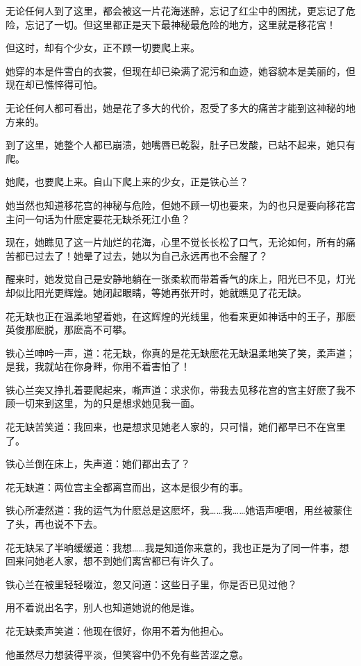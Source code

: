 \documentclass[12pt,oneside]{book}
\begin{document}
无论任何人到了这里，都会被这一片花海迷醉，忘记了红尘中的困扰，更忘记了危险，忘记了一切。但这里都正是天下最神秘最危险的地方，这里就是移花宫！

但这时，却有个少女，正不顾一切要爬上来。

她穿的本是件雪白的衣裳，但现在却已染满了泥污和血迹，她容貌本是美丽的，但现在却已憔悴得可怕。

无论任何人都可看出，她是花了多大的代价，忍受了多大的痛苦才能到这神秘的地方来的。

到了这里，她整个人都已崩溃，她嘴唇已乾裂，肚子已发酸，已站不起来，她只有爬。

她爬，也要爬上来。自山下爬上来的少女，正是铁心兰？

她当然也知道移花宫的神秘与危险，但她不顾一切也要来，为的也只是要向移花宫主问一句话为什麽定要花无缺杀死江小鱼？

现在，她瞧见了这一片灿烂的花海，心里不觉长长松了口气，无论如何，所有的痛苦都已过去了！她晕了过去，她以为自己永远再也不会醒了？

醒来时，她发觉自己是安静地躺在一张柔软而带着香气的床上，阳光已不见，灯光却似比阳光更辉煌。她闭起眼睛，等她再张开时，她就瞧见了花无缺。

花无缺也正在温柔地望着她，在这辉煌的光线里，他看来更如神话中的王子，那麽英俊那麽脱，那麽高不可攀。

铁心兰呻吟一声，道：花无缺，你真的是花无缺麽花无缺温柔地笑了笑，柔声道；是我，我就站在你身畔，你用不着害怕了！

铁心兰突又挣扎着要爬起来，嘶声道：求求你，带我去见移花宫的宫主好麽了我不顾一切来到这里，为的只是想求她见我一面。

花无缺苦笑道：我回来，也是想求见她老人家的，只可惜，她们都早已不在宫里了。

铁心兰倒在床上，失声道：她们都出去了？

花无缺道：两位宫主全都离宫而出，这本是很少有的事。

铁心所凄然道：我的运气为什麽总是这麽坏，我\ldots\ldots 我\ldots\ldots 她语声哽咽，用丝被蒙住了头，再也说不下去。

花无缺呆了半晌缓缓道：我想\ldots\ldots 我是知道你来意的，我也正是为了同一件事，想回来问她老人家，想不到她们离宫都已有许久了。

铁心兰在被里轻轻啜泣，忽又问道：这些日子里，你是否已见过他？

用不着说出名字，别人也知道她说的他是谁。

花无缺柔声笑道：他现在很好，你用不着为他担心。

他虽然尽力想装得平淡，但笑容中仍不免有些苦涩之意。
\end{document}
